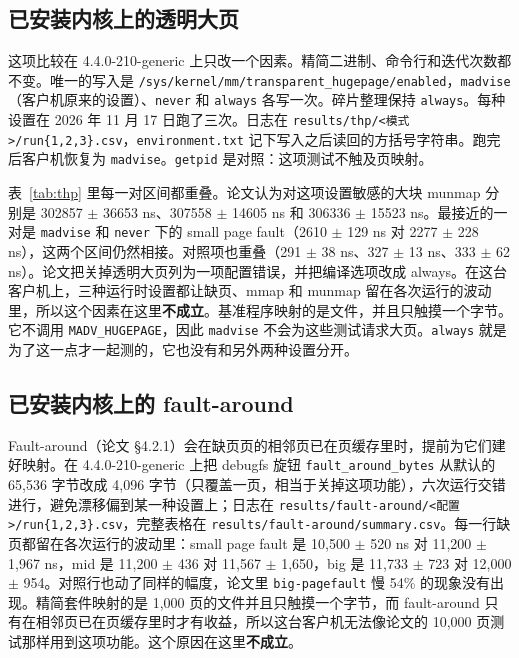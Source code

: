 \documentclass[11pt,fontset=none]{ctexart}
\begin{document}
\subsection{已安装内核上的透明大页}

这项比较在 4.4.0-210-generic 上只改一个因素。精简二进制、命令行和迭代次数都不变。唯一的写入是 \texttt{/sys/kernel/mm/transparent\_hugepage/enabled}，\texttt{madvise}（客户机原来的设置）、\texttt{never} 和 \texttt{always} 各写一次。碎片整理保持 \texttt{always}。每种设置在 2026 年 11 月 17 日跑了三次。日志在 \texttt{results/thp/<模式>/run\{1,2,3\}.csv}，\texttt{environment.txt} 记下写入之后读回的方括号字符串。跑完后客户机恢复为 \texttt{madvise}。\texttt{getpid} 是对照：这项测试不触及页映射。

\begin{table}[ht]
\centering
\caption{同一内核上的透明大页。每格是三次 K-best 的均值 $\pm$ 样本标准差。}
\label{tab:thp}

\end{table}

表~\ref{tab:thp} 里每一对区间都重叠。论文认为对这项设置敏感的大块 munmap 分别是 302857 $\pm$ 36653 ns、307558 $\pm$ 14605 ns 和 306336 $\pm$ 15523 ns。最接近的一对是 \texttt{madvise} 和 \texttt{never} 下的 small page fault（2610 $\pm$ 129 ns 对 2277 $\pm$ 228 ns），这两个区间仍然相接。对照项也重叠（291 $\pm$ 38 ns、327 $\pm$ 13 ns、333 $\pm$ 62 ns）。论文把关掉透明大页列为一项配置错误，并把编译选项改成 always。在这台客户机上，三种运行时设置都让缺页、mmap 和 munmap 留在各次运行的波动里，所以这个因素在这里\textbf{不成立}。基准程序映射的是文件，并且只触摸一个字节。它不调用 \texttt{MADV\_HUGEPAGE}，因此 \texttt{madvise} 不会为这些测试请求大页。\texttt{always} 就是为了这一点才一起测的，它也没有和另外两种设置分开。

\subsection{已安装内核上的 fault-around}

Fault-around（论文 \S4.2.1）会在缺页页的相邻页已在页缓存里时，提前为它们建好映射。在 4.4.0-210-generic 上把 debugfs 旋钮 \texttt{fault\_around\_bytes} 从默认的 65{,}536 字节改成 4{,}096 字节（只覆盖一页，相当于关掉这项功能），六次运行交错进行，避免漂移偏到某一种设置上；日志在 \texttt{results/fault-around/<配置>/run\{1,2,3\}.csv}，完整表格在 \texttt{results/fault-around/summary.csv}。每一行缺页都留在各次运行的波动里：small page fault 是 10{,}500 $\pm$ 520 ns 对 11{,}200 $\pm$ 1{,}967 ns，mid 是 11{,}200 $\pm$ 436 对 11{,}567 $\pm$ 1{,}650，big 是 11{,}733 $\pm$ 723 对 12{,}000 $\pm$ 954。对照行也动了同样的幅度，论文里 \texttt{big-pagefault} 慢 54\% 的现象没有出现。精简套件映射的是 1{,}000 页的文件并且只触摸一个字节，而 fault-around 只有在相邻页已在页缓存里时才有收益，所以这台客户机无法像论文的 10{,}000 页测试那样用到这项功能。这个原因在这里\textbf{不成立}。
\end{document}
